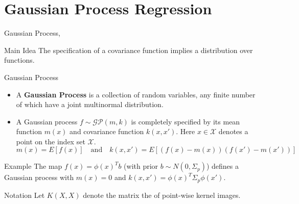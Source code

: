 \documentclass[10pt]{beamer}
\begin{document}
\section{Gaussian Process Regression}


\begin{frame}{Gaussian Process}{\cite[Chapter 21]{BDA13}, \cite[Chapter 2.2]{RW05}}
\begin{block}{Main Idea}
The specification of a covariance function implies a distribution over functions.
\end{block}
\begin{block}{Gaussian Process}
\begin{itemize}
\item A {\bf Gaussian Process} is a collection of random variables, any finite number of which have a joint multinormal distribution. \\
\item A Gaussian process $f \sim \mathcal{GP}(m, k)$ is completely specified by its mean function $m(x)$ and covariance function $k(x, x')$. Here $x \in \mathcal{X}$ denotes a point on the index set $\mathcal{X}$.
$$
m(x) = E[f(x)]
\quad
\text{and}
\quad
k(x, x') = E[(f(x) - m(x))(f(x') - m(x'))]
$$
\end{itemize}
\end{block}
\pause 
\begin{block}{Example}
The map $f(x) = \phi(x)^T b $ (with prior $b\sim N(0, \Sigma_p)$) defines a Gaussian process with $m(x)=0$ and $k(x, x') = \phi(x)^T\Sigma_p\phi(x')$.
\end{block}
\begin{block}{Notation}
Let $K(X, X)$ denote the matrix the of point-wise kernel images. 
\end{block}
\end{frame}
\end{document}
